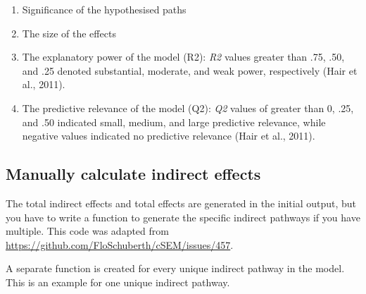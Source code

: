 \documentclass[
  letterpaper,
  DIV=11,
  numbers=noendperiod]{scrreprt}
\begin{document}
\begin{enumerate}
\def\labelenumi{\arabic{enumi}.}
\item
  Significance of the hypothesised paths
\item
  The size of the effects
\item
  The explanatory power of the model (R2): \emph{R2} values greater than
  .75, .50, and .25 denoted substantial, moderate, and weak power,
  respectively (Hair et al., 2011).
\item
  The predictive relevance of the model (Q2): \emph{Q2} values of
  greater than 0, .25, and .50 indicated small, medium, and large
  predictive relevance, while negative values indicated no predictive
  relevance (Hair et al., 2011).
\end{enumerate}

\subsection{Manually calculate indirect
effects}\label{manually-calculate-indirect-effects}

The total indirect effects and total effects are generated in the
initial output, but you have to write a function to generate the
specific indirect pathways if you have multiple. This code was adapted
from \url{https://github.com/FloSchuberth/cSEM/issues/457}.

A separate function is created for every unique indirect pathway in the
model. This is an example for one unique indirect pathway.
\end{document}
